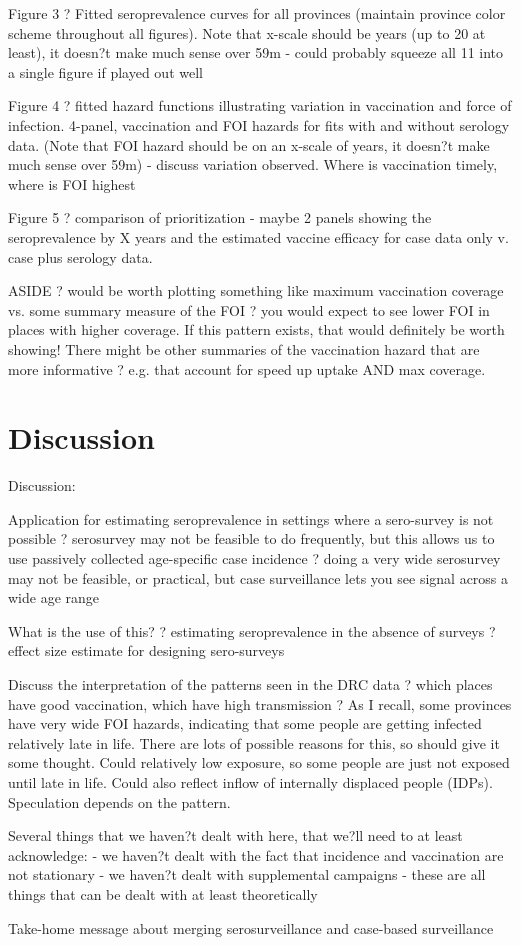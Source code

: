 \documentclass[nofootinbib,aps,pre,twocolumn,superscriptaddress,showkeys,showpacs]{revtex4-1}
\begin{document}
Figure 3 ? Fitted seroprevalence curves for all provinces (maintain province color scheme throughout all figures). Note that x-scale should be years (up to 20 at least), it doesn?t make much sense over 59m
	- could probably squeeze all 11 into a single figure if played out well

Figure 4 ? fitted hazard functions illustrating variation in vaccination and force of infection.  4-panel, vaccination and FOI hazards for fits with and without serology data. (Note that FOI hazard should be on an x-scale of years, it doesn?t make much sense over 59m)
	- discuss variation observed.  Where is vaccination timely, where is FOI highest

Figure 5 ? comparison of prioritization
	- maybe 2 panels showing the seroprevalence by X years and the estimated vaccine efficacy for case data only v. case plus serology data.

	ASIDE ? would be worth plotting something like maximum vaccination coverage vs. some summary measure of the FOI ? you would expect to see lower FOI in places with higher coverage. If this pattern exists, that would definitely be worth showing!  There might be other summaries of the vaccination hazard that are more informative ? e.g. that account for speed up uptake AND max coverage. 

\section{Discussion \label{sec:Discussion}}
Discussion:

Application for estimating seroprevalence in settings where a sero-survey is not possible 
	? serosurvey may not be feasible to do frequently, but this allows us to use passively collected age-specific case incidence 
	? doing a very wide serosurvey may not be feasible, or practical, but case surveillance lets you see signal across a wide age range

What is the use of this?
	? estimating seroprevalence in the absence of surveys
	? effect size estimate for designing sero-surveys

Discuss the interpretation of the patterns seen in the DRC data 
	? which places have good vaccination, which have high transmission
	? As I recall, some provinces have very wide FOI hazards, indicating that some people are getting infected relatively late in life.  There are lots of possible reasons for this, so should give it some thought.  Could relatively low exposure, so some people are just not exposed until late in life.  Could also reflect inflow of internally displaced people (IDPs).  Speculation depends on the pattern. 

Several things that we haven?t dealt with here, that we?ll need to at least acknowledge:
	- we haven?t dealt with the fact that incidence and vaccination are not stationary
	- we haven?t dealt with supplemental campaigns
	- these are all things that can be dealt with at least theoretically

Take-home message about merging serosurveillance and case-based surveillance



\end{document}
